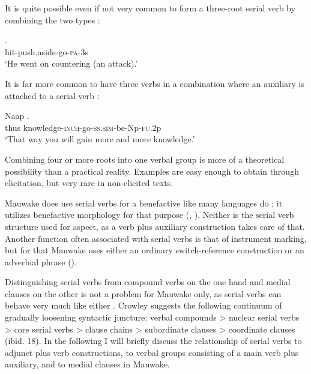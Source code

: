 It is quite possible even if not very common to form a three-root serial verb by combining the two types :

\ea%
\label{ex:3:x385}
\gll {}. \\
hit-push.aside-go-\textsc{pa}-3s \\
\glt`He went on countering (an attack).'
\z

It is far more common to have three verbs in a combination where an auxiliary is attached to a serial verb :

\ea%
\label{ex:3:x386}
\gll Naap . \\
thus knowledge-\textsc{inch}-go-\textsc{ss}.\textsc{sim}-be-Np-\textsc{fu}.2p \\
\glt`That way you will gain more and more knowledge.'
\z

Combining four or more roots into one verbal group is more of a theoretical possibility than a practical reality. Examples are easy enough to obtain through elicitation, but very rare in non-elicited texts.

Mauwake does  use serial verbs for a benefactive like many languages do \citep[174--80]{Sebba1987}; it utilizes benefactive morphology for that purpose (, ). Neither is the serial verb structure used for aspect, as a verb plus auxiliary construction takes care of that. Another function often associated with serial verbs is that of instrument marking, but for that Mauwake uses either an ordinary switch-reference construction or an adverbial phrase ().

Distinguishing serial verbs from compound verbs on the one hand and medial clauses on the other is not a problem for Mauwake only, as serial verbs can behave very much like either \citep[17]{Crowley2002}. Crowley suggests the following continuum of gradually loosening syntactic juncture: verbal compounds {{\textgreater}} nuclear serial verbs {{\textgreater}} core serial verbs {{\textgreater}} clause chains {{\textgreater}} subordinate clauses {{\textgreater}} coordinate clauses (ibid. 18). In the following I will briefly discuss the relationship of serial verbs to adjunct plus verb constructions, to verbal groups consisting of a main verb plus auxiliary, and to medial clauses in Mauwake. 

